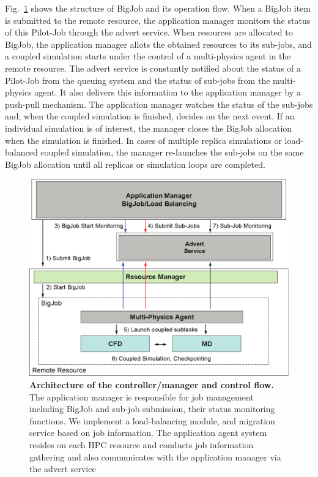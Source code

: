 \documentclass[preprint,12pt]{elsarticle}
\begin{document}
Fig.~\ref{Fig:BigJob_Structure}  shows the structure of BigJob and its operation flow. When a BigJob item is submitted to the remote resource, the application manager monitors the status of this Pilot-Job through the advert service. When resources are allocated to BigJob, the application manager allots the obtained resources to its sub-jobs, and a coupled simulation starts under the control of a multi-physics agent in the remote resource. The advert service is constantly notified about the status of a Pilot-Job from the queuing system and the status of sub-jobs from the multi-physics agent. It also delivers this information to the application manager by a push-pull mechanism. The application manager watches the status of the sub-jobs and, when the coupled simulation is finished, decides on the next event. If an individual simulation is of interest, the manager closes the BigJob allocation when the simulation is finished. In cases of multiple replica simulations or load-balanced coupled simulation, the manager re-launches the sub-jobs on the same BigJob allocation until all replicas or simulation loops are completed.


\begin{figure}
\centering
\includegraphics[width=0.8\linewidth]{Structure_of_BigJob}
\caption{\small {\bf Architecture of the controller/manager and control flow.} The application manager is responsible for job management including BigJob and sub-job submission, their status monitoring functions. We implement a load-balancing module, and migration service based on job information. The application agent system resides on each HPC resource and conducts job information gathering and also communicates with the application manager via the advert service}
\label{Fig:BigJob_Structure}
\vspace{-1em}
\end{figure}
\end{document}
